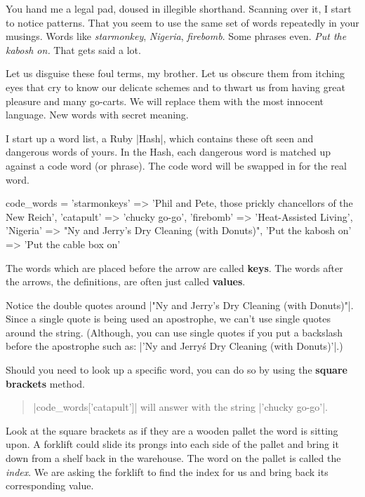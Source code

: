 \documentclass[12pt,twoside]{report}
\begin{document}
You hand me a legal pad, doused in illegible shorthand.  Scanning over
it, I start to notice patterns.  That you seem to use the same set of
words repeatedly in your musings.  Words like {\em starmonkey}, {\em
  Nigeria}, {\em firebomb}.  Some phrases even.  {\em Put the kabosh
  on.} That gets said a lot.

Let us disguise these foul terms, my brother.  Let us obscure them
from itching eyes that cry to know our delicate schemes and to thwart
us from having great pleasure and many go-carts. We will replace them
with the most innocent language.  New words with secret meaning.

I start up a word list, a Ruby \rubyinline|Hash|,
which contains these oft seen and dangerous words of yours. In the
Hash, each dangerous word is matched up against a code word (or
phrase).  The code word will be swapped in for the real word.


\begin{rubycode}

 code_words = {
   'starmonkeys' => 'Phil and Pete, those prickly chancellors of the New Reich',
   'catapult' => 'chucky go-go', 'firebomb' => 'Heat-Assisted Living',
   'Nigeria' => "Ny and Jerry's Dry Cleaning (with Donuts)",
   'Put the kabosh on' => 'Put the cable box on'
 }

\end{rubycode}

The words which are placed before the arrow are called {\bf keys}.
The words after the arrows, the definitions, are often just called
{\bf values}.

Notice the double quotes around \rubyinline|"Ny and Jerry's Dry Cleaning (with Donuts)"|.
Since a single quote is being used an apostrophe, we can't use single
quotes around the string.  (Although, you can use single quotes if you
put a backslash before the apostrophe such as:
\rubyinline|'Ny and Jerry\'s Dry Cleaning (with Donuts)'|.)

Should you need to look up a specific word, you can do so by using the
{\bf square brackets} method.

\begin{quote}
\rubyinline|code_words['catapult']| will answer with
the string \rubyinline|'chucky go-go'|.\end{quote}


Look at the square brackets as if they are a wooden pallet the word is
sitting upon. A forklift could slide its prongs into each side of the
pallet and bring it down from a shelf back in the warehouse.  The word
on the pallet is called the {\em index}. We are asking the forklift to
find the index for us and bring back its corresponding value.
\end{document}
